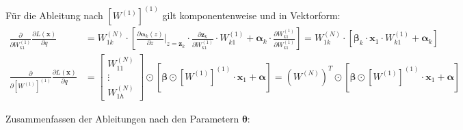 \documentclass[a4paper, 12pt]{scrartcl}
\begin{document}
Für die Ableitung nach $\left[W^{(1)}\right]^{(1)}$ gilt komponentenweise und in Vektorform:
\begin{align*}
    \frac{\partial}{\partial W_{k1}^{(1)}} \frac{\partial L(\bm{x})}{\partial q}
    &=
    W^{(N)}_{1k} 
    \cdot
    \left[
        \frac{\partial \bm{\alpha}_k (z)}{\partial z} \bigg|_{z = \bm{z}_k} 
        \cdot
        \frac{\partial \bm{z}_k}{\partial W_{k1}^{(1)}} 
        \cdot 
        W_{k1}^{(1)}
        +
        \bm{\alpha}_k 
        \cdot 
        \frac{\partial W_{k1}^{(1)}}{\partial W_{k1}^{(1)}}
    \right]
    =
    W^{(N)}_{1k} 
    \cdot
    \left[
        \bm{\beta}_k
        \cdot
        \bm{x}_1
        \cdot 
        W_{k1}^{(1)}
        +
        \bm{\alpha}_k 
    \right]
    \\
    \frac{\partial}{\partial \left[W^{(1)}\right]^{(1)}} \frac{\partial L(\bm{x})}{\partial q}
    &=
    \begin{bmatrix}
        W_{11}^{(N)} \\
        \vdots \\
        W_{1h}^{(N)}
    \end{bmatrix}
    \odot
    \left[
        \bm{\beta} \odot \left[W^{(1)}\right]^{(1)} \cdot \bm{x}_1 + \bm{\alpha}
    \right]
    =
    \left(W^{(N)}\right)^T 
    \odot
    \left[
        \bm{\beta} \odot \left[W^{(1)}\right]^{(1)} \cdot \bm{x}_1 + \bm{\alpha}
    \right]
\end{align*}

Zusammenfassen der Ableitungen nach den Parametern $\bm{\theta}$:
\end{document}
